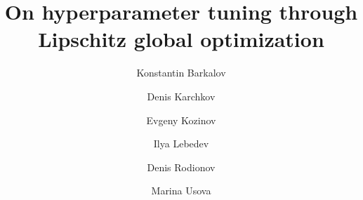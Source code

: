 \documentclass[preprint,12pt]{elsarticle}
\begin{document}
\begin{frontmatter}



\title{On hyperparameter tuning through Lipschitz global optimization} %


\author[UNN,ITMO]{Konstantin Barkalov}
\author[UNN,ITMO]{Denis Karchkov}
\author[UNN,ITMO]{Evgeny Kozinov}
\author[UNN,ITMO]{Ilya Lebedev}
\author[UNN,ITMO]{Denis Rodionov}
\author[UNN,ITMO]{Marina Usova}

						


\begin{abstract}


\end{abstract}
\end{frontmatter}
\end{document}
